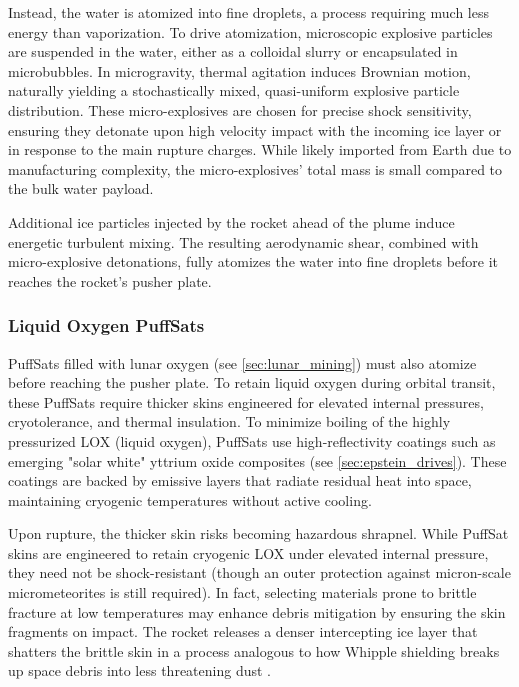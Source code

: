 \documentclass{article}
\begin{document}
Instead, the water is atomized into fine droplets, a process requiring much less energy than vaporization. To drive atomization, microscopic explosive particles are suspended in the water, either as a colloidal slurry or encapsulated in microbubbles. In microgravity, thermal agitation induces Brownian motion, naturally yielding a stochastically mixed, quasi-uniform explosive particle distribution. These micro-explosives are chosen for precise shock sensitivity, ensuring they detonate upon high velocity impact with the incoming ice layer or in response to the main rupture charges. While likely imported from Earth due to manufacturing complexity, the micro-explosives' total mass is small compared to the bulk water payload.

Additional ice particles injected by the rocket ahead of the plume induce energetic turbulent mixing. The resulting aerodynamic shear, combined with micro-explosive detonations, fully atomizes the water into fine droplets before it reaches the rocket’s pusher plate.

\subsubsection{Liquid Oxygen PuffSats}\label{sec:lox_puffsat}
PuffSats filled with lunar oxygen (see \autoref{sec:lunar_mining}) must also atomize before reaching the pusher plate. To retain liquid oxygen during orbital transit, these PuffSats require thicker skins engineered for elevated internal pressures, cryotolerance, and thermal insulation. To minimize boiling of the highly pressurized LOX (liquid oxygen), PuffSats use high-reflectivity coatings such as emerging "solar white" yttrium oxide composites (see \autoref{sec:epstein_drives}).  These coatings are backed by emissive layers that radiate residual heat into space, maintaining cryogenic temperatures without active cooling.

Upon rupture, the thicker skin risks becoming hazardous shrapnel. While PuffSat skins are engineered to retain cryogenic LOX under elevated internal pressure, they need not be shock-resistant (though an outer protection against micron-scale micrometeorites is still required). In fact, selecting materials prone to brittle fracture at low temperatures may enhance debris mitigation by ensuring the skin fragments on impact. The rocket releases a denser intercepting ice layer that shatters the brittle skin in a process analogous to how Whipple shielding breaks up space debris into less threatening dust \cite{whipple_shield}.
\end{document}
